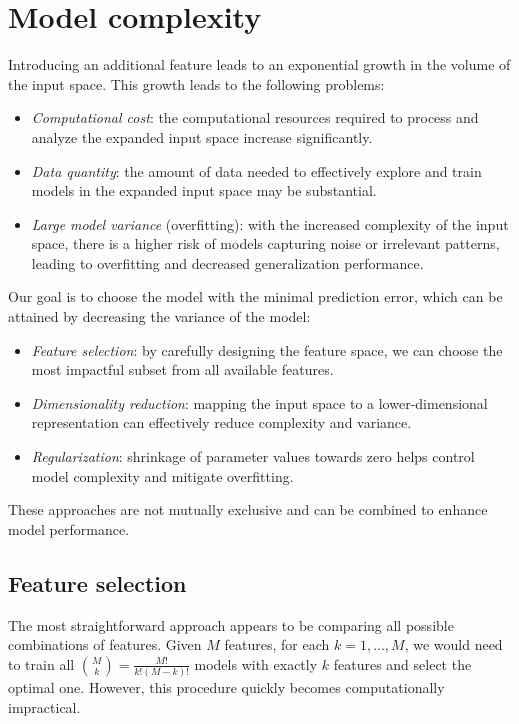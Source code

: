 \section{Model complexity}

Introducing an additional feature leads to an exponential growth in the volume of the input space.
This growth leads to the following problems: 
\begin{itemize}
    \item \textit{Computational cost}: the computational resources required to process and analyze the expanded input space increase significantly.
    \item \textit{Data quantity}: the amount of data needed to effectively explore and train models in the expanded input space may be substantial.
    \item \textit{Large model variance} (overfitting): with the increased complexity of the input space, there is a higher risk of models capturing noise or irrelevant patterns, leading to overfitting and decreased generalization performance.
\end{itemize}

Our goal is to choose the model with the minimal prediction error, which can be attained by decreasing the variance of the model:
\begin{itemize}
    \item \textit{Feature selection}: by carefully designing the feature space, we can choose the most impactful subset from all available features.
    \item \textit{Dimensionality reduction}: mapping the input space to a lower-dimensional representation can effectively reduce complexity and variance.
    \item \textit{Regularization}: shrinkage of parameter values towards zero helps control model complexity and mitigate overfitting.
\end{itemize}
These approaches are not mutually exclusive and can be combined to enhance model performance.

\subsection{Feature selection}
The most straightforward approach appears to be comparing all possible combinations of features.
Given $M$ features, for each $k=1,\dots,M$, we would need to train all $\binom{M}{k}=\frac{M!}{k!(M-k)!}$ models with exactly $k$ features and select the optimal one. 
However, this procedure quickly becomes computationally impractical.

